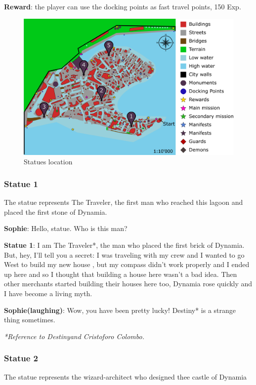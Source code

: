 \textbf{Reward}: the player can use the docking points as fast travel points, 150 Exp.

\begin{figure}[H]
  \centering
  \includegraphics[width=\textwidth]{../Images/Maps/dynamiaSecondaryMissions_Statues}
  \caption{Statues location}
\end{figure}

\subsubsection*{Statue 1}
The statue represents The Traveler, the first man who reached this lagoon and placed the first stone of Dynamia.

\textbf{Sophie}: Hello, statue. Who is this man?

\textbf{Statue 1}: I am The Traveler*, the man who placed the first brick of Dynamia. But, hey, I'll tell you a secret: I was traveling with my crew and I wanted to go West to build my new house , but my compass didn't work properly and I ended up here and so I thought that building a house here wasn't a bad idea. Then other merchants started building their houses here too, Dynamia rose quickly and I have become a living myth.

\textbf{Sophie(laughing)}: Wow, you have been pretty lucky! Destiny* is a strange thing sometimes.

\textit{*Reference to Destiny\texttrademark and Cristoforo Colombo.}

\subsubsection*{Statue 2}
The statue represents the wizard-architect who designed thee castle of Dynamia

